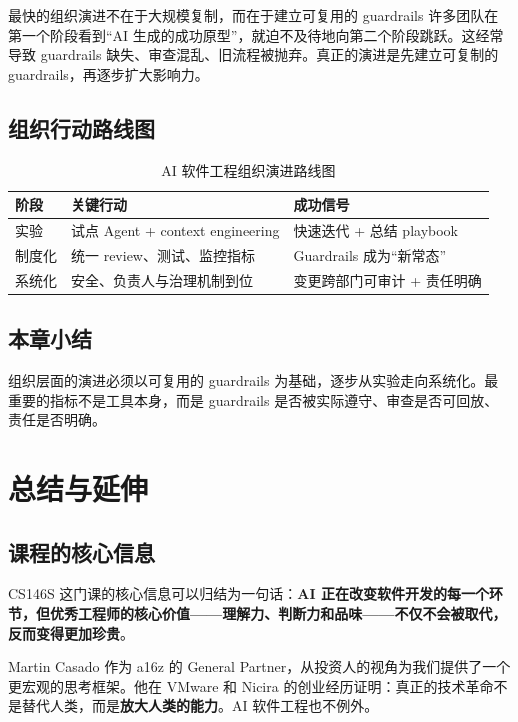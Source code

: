 \documentclass[a4paper]{article}
\begin{document}
\begin{importantbox}{最快的组织演进不在于大规模复制，而在于建立可复用的 guardrails}
许多团队在第一个阶段看到“AI 生成的成功原型”，就迫不及待地向第二个阶段跳跃。这经常导致 guardrails 缺失、审查混乱、旧流程被抛弃。真正的演进是先建立可复制的 guardrails，再逐步扩大影响力。
\end{importantbox}

\subsection{组织行动路线图}

\begin{table}[H]
\centering
\begin{tabular}{p{} p{} p{}}
\toprule
阶段 & 关键行动 & 成功信号 \\
\midrule
实验 & 试点 Agent + context engineering & 快速迭代 + 总结 playbook \\
制度化 & 统一 review、测试、监控指标 & Guardrails 成为“新常态” \\
系统化 & 安全、负责人与治理机制到位 & 变更跨部门可审计 + 责任明确 \\
\bottomrule
\end{tabular}
\caption{AI 软件工程组织演进路线图}
\end{table}

\subsection{本章小结}

组织层面的演进必须以可复用的 guardrails 为基础，逐步从实验走向系统化。最重要的指标不是工具本身，而是 guardrails 是否被实际遵守、审查是否可回放、责任是否明确。

\section{总结与延伸}

\subsection{课程的核心信息}

CS146S 这门课的核心信息可以归结为一句话：\textbf{AI 正在改变软件开发的每一个环节，但优秀工程师的核心价值——理解力、判断力和品味——不仅不会被取代，反而变得更加珍贵}。

Martin Casado 作为 a16z 的 General Partner，从投资人的视角为我们提供了一个更宏观的思考框架。他在 VMware 和 Nicira 的创业经历证明：真正的技术革命不是替代人类，而是\textbf{放大人类的能力}。AI 软件工程也不例外。
\end{document}

